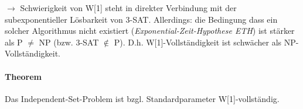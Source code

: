 $\longrightarrow$ Schwierigkeit von W[1] steht in direkter Verbindung mit der subexponentieller Lösbarkeit von 3-SAT.
Allerdings: die Bedingung dass ein solcher Algorithmus nicht existiert (\emph{Exponential-Zeit-Hypothese ETH})
ist stärker als P $\neq$ NP (bzw. 3-SAT $\notin$ P).
D.h. W[1]-Vollständigkeit ist schwächer als NP-Vollständigkeit.

\paragraph{Theorem}
Das Independent-Set-Problem ist bzgl. Standardparameter W[1]-vollständig.
